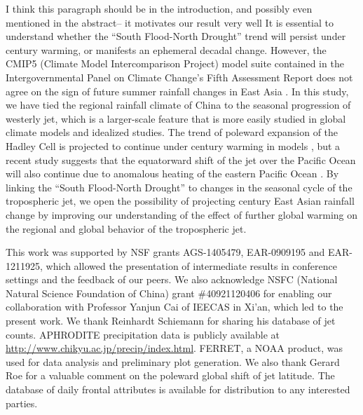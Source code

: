 \documentclass[draft,grl]{AGUTeX}
\begin{document}
\begin{article}
{\color{red} I think this paragraph should be in the introduction, and possibly even mentioned in the abstract-- it motivates our result very well} 
	It is essential to understand whether the ``South Flood-North Drought'' trend will persist under  century warming, or manifests an ephemeral decadal change. However, the CMIP5 (Climate Model Intercomparison Project) model suite contained in the Intergovernmental Panel on Climate Change's Fifth Assessment Report does not agree on the sign of future summer rainfall changes in East Asia \citep{Christensen2011}. In this study, we have tied the regional rainfall climate of China to the seasonal progression of westerly jet, which is a larger-scale feature that is more easily studied in global climate models and idealized studies. The trend of poleward expansion of the Hadley Cell is projected to continue under  century warming in models \citep{Lu2007,Kang2012}, but a recent study suggests that the equatorward shift of the jet over the Pacific Ocean will also continue due to anomalous heating of the eastern Pacific Ocean \citep{Park2014}. By linking the ``South Flood-North Drought'' to changes in the seasonal cycle of the tropospheric jet, we open the possibility of projecting  century East Asian rainfall change by improving our understanding of the effect of further global warming on the regional and global behavior of the tropospheric jet.
	


\begin{acknowledgments}
This work was supported by NSF grants AGS-1405479, EAR-0909195 and EAR-1211925, which allowed the presentation of intermediate results in conference settings and the feedback of our peers. We also acknowledge NSFC (National Natural Science Foundation of China) grant \#40921120406 for enabling our collaboration with Professor Yanjun Cai of IEECAS in Xi'an, which led to the present work. We thank Reinhardt Schiemann for sharing his database of jet counts. APHRODITE precipitation data is publicly available at \url{http://www.chikyu.ac.jp/precip/index.html}. FERRET, a NOAA product, was used for data analysis and preliminary plot generation. We also thank Gerard Roe for a valuable comment on the poleward global shift of jet latitude. The database of daily frontal attributes is available for distribution to any interested parties.
\end{acknowledgments}




%
%
\end{article}
%
%
%
%
%
\end{document}
